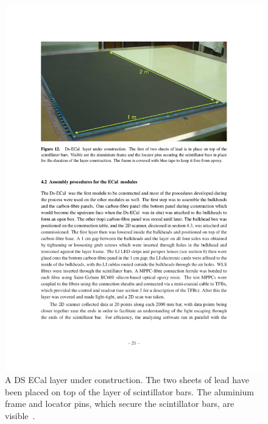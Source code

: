 {\begin{figure}[t!]
  \includegraphics[width=14cm]{images/t2k/ECalLayerConstruction.pdf}
  \caption{A DS ECal layer under construction.  The two sheets of lead have been placed on top of the layer of scintillator bars.  The aluminium frame and locator pins, which secure the scintillator bars, are visible~\cite{1748-0221-8-10-P10019}.}
  \label{fig:ECalLayerConstruction}
\end{figure}
\newline
\newline
}
